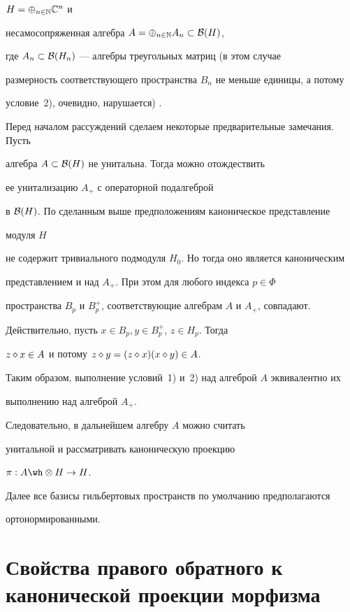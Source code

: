 $H= \oplus_{n \in \Bbb N} \Bbb C^n$ и


несамосопряженная алгебра $A= \oplus_{n \in \Bbb N} A_n \subset {\cal B} (H)$,


где $A_n \subset {\cal B} (H_n)$ --- алгебры треугольных матриц (в этом случае


размерность соответствующего пространства $B_n$ не меньше единицы, а потому


условие~2), очевидно, нарушается) \cite{Chel44}.





Перед началом рассуждений сделаем некоторые предварительные замечания. Пусть


алгебра $A \subset {\cal B}(H)$ не унитальна. Тогда можно отождествить


ее унитализацию $A_+$ с операторной подалгеброй


в ${\cal B} (H)$. По сделанным выше предположениям каноническое представление


модуля $H$


не содержит тривиального подмодуля $H_0$. Но тогда оно является каноническим


представлением и над $A_+$. При этом для любого индекса $p \in \Phi$


пространства $B_p$ и $B_p^+$, соответствующие алгебрам $A$ и $A_+$, совпадают.


Действительно, пусть $x \in B_p,y \in B_p^+$, $z \in H_p$. Тогда


$z \diamond x \in A$ и потому $z \diamond y=(z \diamond x)(x \diamond y) \in A$.


Таким образом, выполнение условий~1) и~2) над алгеброй $A$ эквивалентно их


выполнению над алгеброй $A_+$. 


Следовательно, в дальнейшем алгебру $A$ можно считать


унитальной и рассматривать каноническую проекцию


$\pi :A \tens H \to H$.





Далее все базисы гильбертовых пространств по умолчанию предполагаются


ортонормированными.





\section{Свойства правого обратного к канонической проекции морфизма}





